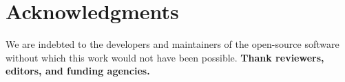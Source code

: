 \documentclass[twocolumn]{article}
\title{\Title}
\author{ 
    Leonardo Uieda, 
    Vanderlei C. Oliveira Jr.
}
\begin{document}
    \maketitle

    \begin{abstract}
        \lipsum[1]
    \end{abstract}

    
    
    
    
    

    \section{Acknowledgments}

    We are indebted to the developers and maintainers of the open-source
    software without which this work would not have been possible.
    \textbf{Thank reviewers, editors, and funding agencies.}

    
    
\end{document}

